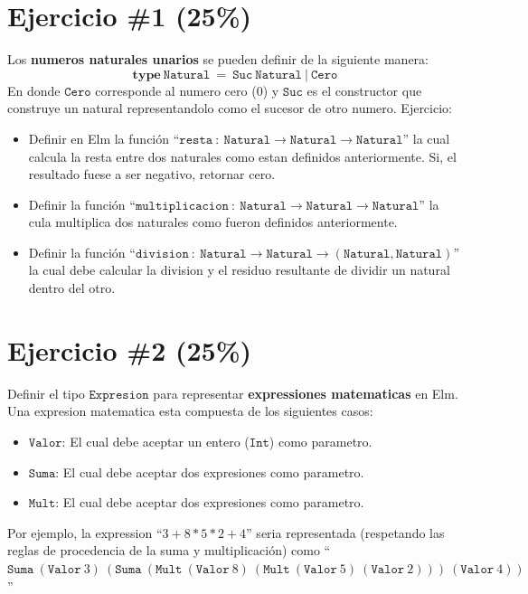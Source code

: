 \documentclass{article}
\begin{document}
\section*{Ejercicio \#1 (25\%)}
Los {\bf numeros naturales unarios} se pueden definir de la siguiente manera:
$$
        \mathbf{type}\ \mathtt{Natural}\ =\ \mathtt{Suc\ Natural}\ |\ \mathtt{Cero}
$$
En donde $\mathtt{Cero}$ corresponde al numero cero (0) y $\mathtt{Suc}$ es
el constructor que construye un natural representandolo como el sucesor de
otro numero. Ejercicio:
\begin{itemize}
        \item{Definir en Elm la funci\'on ``$\mathtt{resta}\ :\ \mathtt{Natural}
        \rightarrow\mathtt{Natural}\rightarrow\mathtt{Natural}$'' la cual calcula
        la resta entre dos naturales como estan definidos anteriormente. Si, el
        resultado fuese a ser negativo, retornar cero.}
        \item{Definir la funci\'on ``$\mathtt{multiplicacion}\ :\ \mathtt{Natural}
        \rightarrow\mathtt{Natural}\rightarrow\mathtt{Natural}$'' la cula multiplica
        dos naturales como fueron definidos anteriormente.}
        \item{Definir la funci\'on ``$\mathtt{division}\ :\ \mathtt{Natural}
        \rightarrow\mathtt{Natural}\rightarrow(\mathtt{Natural},\mathtt{Natural})$'' la cual debe
        calcular la division y el residuo resultante de dividir un natural dentro
        del otro.}
\end{itemize}

\section*{Ejercicio \#2 (25\%)}

Definir el tipo $\mathtt{Expresion}$ para representar {\bf expressiones matematicas} en Elm. Una expresion matematica
esta compuesta de los siguientes casos:
\begin{itemize}
        \item{$\mathtt{Valor}$: El cual debe aceptar un entero ($\mathtt{Int}$) como parametro.}
        \item{$\mathtt{Suma}$: El cual debe aceptar dos expresiones como parametro.}
        \item{$\mathtt{Mult}$: El cual debe aceptar dos expresiones como parametro.}
\end{itemize}
Por ejemplo, la expression ``$3+8*5*2+4$'' seria representada (respetando las reglas de 
procedencia de la suma y multiplicaci\'on) como ``$\mathtt{Suma}\ (\mathtt{Valor}\ 3)\ (\mathtt{Suma}
\ (\mathtt{Mult}\ (\mathtt{Valor}\ 8)\ (\mathtt{Mult}\ (\mathtt{Valor}\ 5)\ (\mathtt{Valor}\ 2)))\ (\mathtt{Valor}\ 4))$''
\end{document}
